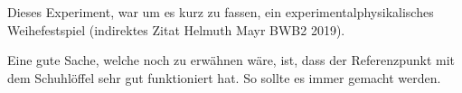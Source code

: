 \documentclass[11pt,ngerman]{scrartcl}
\begin{document}
Dieses Experiment, war um es kurz zu fassen, ein experimentalphysikalisches
Weihefestspiel (indirektes Zitat Helmuth Mayr BWB2 2019).

Eine gute Sache, welche noch zu erwähnen wäre, ist, dass der Referenzpunkt mit
dem Schuhlöffel sehr gut funktioniert hat. So sollte es immer gemacht werden.




\newpage
\printbibliography

\listoffigures

\listoftables
\end{document}
